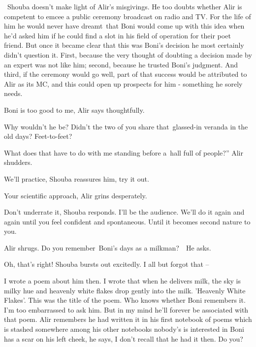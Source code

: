 \documentclass[letterpaper]{article}
\begin{document}
~Shouba doesn't make light of Alir's misgivings. He too doubts whether Alir is competent to emcee a public ceremony
broadcast on radio and TV. For the life of him he would never have dreamt~that Boni would come up with this idea when
he'd asked him if he could find a slot in his field of operation for their poet friend. But once it became clear that
this was Boni's decision he most certainly didn't question it. First, because the very thought of doubting a decision
made by an expert was not like him; second, because he trusted Boni's judgment. And third, if the ceremony would go
well, part of that success would be attributed to Alir as its MC, and this could open up prospects for him - something
he sorely needs.

{\textquotedbl}Boni is too good to me,{\textquotedbl} Alir says thoughtfully.

{\textquotedbl}Why wouldn't he be? Didn't the two of you share that\ glassed-in veranda in the old days?
Feet-to-feet?{\textquotedbl}

{\textquotedbl}What does that have to do with me standing before a~hall full of people?'' Alir shudders. 

{\textquotedbl}We'll practice,{\textquotedbl} Shouba reassures him, {\textquotedbl}try it out.{\textquotedbl} 

{\textquotedbl}Your scientific approach,{\textquotedbl} Alir grins desperately. 

{\textquotedbl}Don't underrate it,{\textquotedbl} Shouba responds. {\textquotedbl}I'll be the audience. We'll do it
again and again until you feel confident and spontaneous. Until it becomes second nature to you.{\textquotedbl} 

Alir shrugs. {\textquotedbl}Do you remember~Boni's days as a milkman?{\textquotedbl}\ \ He asks. 

{\textquotedbl}Oh, that's right!{\textquotedbl} Shouba bursts out excitedly. {\textquotedbl}I all but forgot that
--{\textquotedbl}

{\textquotedbl}I wrote a poem about him then. I wrote that when he delivers milk, the sky is milky hue and heavenly
white flakes drop gently into the milk. 'Heavenly White Flakes'. This was the title of the poem. Who knows whether Boni
remembers it. I'm too embarrassed to ask him. But in my mind he'll forever be associated with that poem.{\textquotedbl}
Alir remembers he had written it in his first notebook of poems which is stashed somewhere among his other notebooks
nobody's is interested in {\textquotedbl}Boni has a scar on his left cheek,{\textquotedbl} he says, {\textquotedbl}I
don't recall that he had it then. Do you?{\textquotedbl}\ \ 
\end{document}
